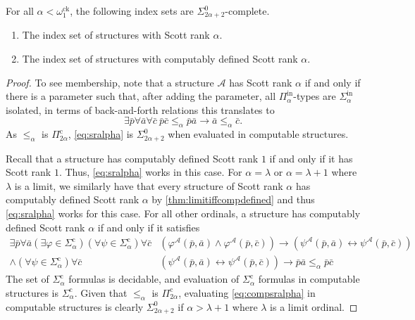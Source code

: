 \documentclass[10pt,a4paper]{amsart}
\newcommand\+[1]{\mathcal{#1}}
\renewcommand\*[1]{\mathbf{#1}}
\renewcommand\=[1]{\text{#1}}
\renewcommand\*[1]{\mathbf{#1}}
\renewcommand{\phi}{\varphi}
\newcommand{\Pinf}[1]{\Pi^{\mathrm{in}}_{#1}}
\newcommand{\Picom}[1]{\Pi^{\mathrm{c}}_{#1}}
\newcommand{\Sinf}[1]{\Sigma^{\mathrm{in}}_{#1}}
\newcommand{\Sicom}[1]{\Sigma^{\mathrm{c}}_{#1}}
\newcommand{\ock}{\omega_{1}^{\mathrm{ck}}}
\begin{document}
\begin{theorem}\label{thm:indexsets} 
    For all $\alpha<\ock$, the following index sets are $\Sigma^0_{2\alpha+2}$-complete.
    \begin{enumerate}
      \item The index set of structures with Scott rank $\alpha$.
      \item The index set of structures with computably defined Scott rank $\alpha$.
    \end{enumerate}
  \end{theorem}
  \begin{proof}
    To see membership, note that a structure $\+A$ has Scott rank $\alpha$ if and only if there is a parameter such that, after adding the parameter, all $\Pinf{\alpha}$-types are $\Sinf{\alpha}$ isolated, in terms of back-and-forth relations this translates to
    \begin{equation}\tag{$\ast$}\label{eq:sralpha} \exists \bar p \forall \bar a \forall \bar c\  \bar p\bar c\leq_\alpha\bar p\bar a \to \bar a\leq_\alpha \bar c. 
    \end{equation}
    As $\leq_\alpha$ is $\Picom{2\alpha}$, \cref{eq:sralpha} is $\Sigma^0_{2\alpha+2}$ when evaluated in computable structures.
    
    Recall that a structure has computably defined Scott rank $1$ if and only if it has Scott rank $1$. Thus, \cref{eq:sralpha} works in this case. For $\alpha=\lambda$ or $\alpha=\lambda+1$ where $\lambda$ is a limit, we similarly have that every structure of Scott rank $\alpha$ has computably defined Scott rank $\alpha$ by \cref{thm:limitiffcompdefined} and thus \cref{eq:sralpha} works for this case. For all other ordinals, a structure has computably defined Scott rank $\alpha$ if and only if
    it satisfies
    \begin{equation}\label{eq:compsralpha}\tag{$\star$}
    \begin{aligned} \exists \bar p \forall \bar a (\exists \phi\in \Sicom{\alpha}) (\forall \psi\in \Sicom{\alpha}) \forall \bar c &\left(\phi^\+A(\bar p,\bar a) \land \phi^\+A(\bar p, \bar c) \right)\to \left(\psi^\+A(\bar p, \bar a)\leftrightarrow \psi^\+A(\bar p, \bar c)\right)\\
    \land(\forall \psi\in \Sicom{\alpha} )\forall \bar c & \left(\psi^\+A(\bar p, \bar a)\leftrightarrow \psi^\+A(\bar p, \bar c)\right)\to \bar p\bar a \leq_\alpha \bar p\bar c\end{aligned}
    \end{equation}
    The set of $\Sicom{\alpha}$ formulas is decidable, and evaluation of $\Sicom{\alpha}$ formulas in computable structures is $\Sicom{\alpha}$. Given that $\leq_{\alpha}$ is $\Picom{2\alpha}$, evaluating \cref{eq:compsralpha} in computable structures is clearly $\Sigma^0_{2\alpha+2}$ if $\alpha>\lambda+1$ where $\lambda$ is a limit ordinal.


\end{proof}
\end{document}

